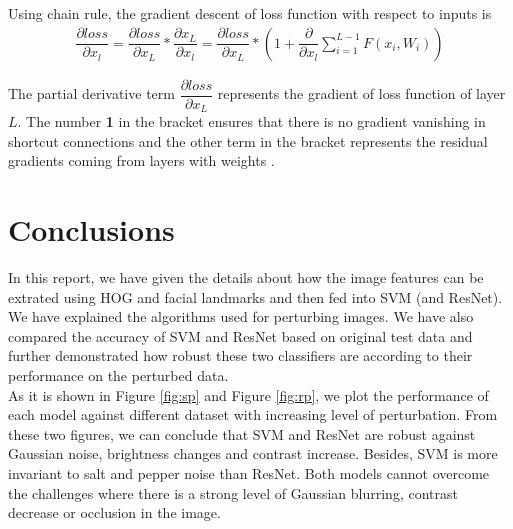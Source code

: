 \documentclass{article}
\begin{document}
Using chain rule, the gradient descent of loss function with respect to inputs is
\begin{align}
    \dfrac{\partial loss}{\partial x_l}=\dfrac{\partial loss}{\partial x_L}*\dfrac{\partial x_L}{\partial x_l} = \dfrac{\partial loss}{\partial x_L}*(1+\dfrac{\partial}{\partial x_l}\sum_{i=1}^{L-1}F(x_i,W_i))
\end{align}

The partial derivative term $\dfrac{\partial loss}{\partial x_L}$ represents the gradient of loss function of layer $L$. The number \textbf{1} in the bracket ensures that there is no gradient vanishing in shortcut connections and the other term in the bracket represents the residual gradients coming from layers with weights \citep{IdentityMappings}.



\section{Conclusions}
\label{sec:concl}
In this report, we have given the details about how the image features can be extrated using HOG and facial landmarks and then fed into SVM (and ResNet). We have explained the algorithms used for perturbing images. We have also compared the accuracy of SVM and ResNet based on original test data and further demonstrated how robust these two classifiers are according to their performance on the perturbed data.\\
As it is shown in Figure \ref{fig:sp} and Figure \ref{fig:rp}, we plot the performance of each model against different dataset with increasing level of perturbation. From these two figures, we can conclude that SVM and ResNet are robust against Gaussian noise, brightness changes and contrast increase. Besides, SVM is more invariant to salt and pepper noise than ResNet. Both models cannot overcome the challenges where there is a strong level of Gaussian blurring, contrast decrease or occlusion in the image.
\end{document}
